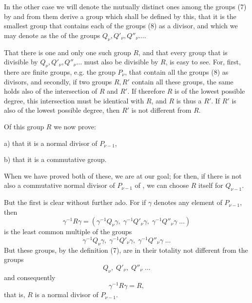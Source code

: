 In the other case we will denote the mutually distinct ones among the groups (7) by
and from them derive a group
which shall be defined by this, that it is the smallest group that contains each of the groups (8) as a divisor, and which we may denote as the  of the groups $Q_\nu, Q'_\nu, Q''_\nu \ldots$.

That there is one and only one such group $R$, and that every group that is divisible by $Q_\nu, Q'_\nu, Q''_\nu \ldots$ must also be divisible by $R$, is easy to see. For, first, there are finite groups, e.g. the group $P_\nu$, that contain all the groups (8) as divisors, and secondly, if two groups $R, R'$ contain all these groups, the same holds also of the intersection of $R$ and $R'$. If therefore $R$ is of the lowest possible degree, this intersection must be identical with $R$, and $R$ is thus a  $R'$. If $R'$ is also of the lowest possible degree, then $R'$ is not different from $R$.

Of this group $R$ we now prove:

a) that it is a normal divisor of $P_{\nu-1}$,

b) that it is a commutative group.

When we have proved both of these, we are at our goal; for then, if there is not also a commutative normal divisor of $P_{\nu-1}$ of , we can choose $R$ itself for $Q_{\nu-1}$.

But the first is clear without further ado. For if $\gamma$ denotes any element of $P_{\nu-1}$, then
\[ \gamma^{-1} R \gamma = (\gamma^{-1} Q_\nu \gamma, \; \gamma^{-1} Q'_\nu \gamma, \; \gamma^{-1} Q''_\nu \gamma \; \ldots) \]
is the least common multiple of the groups
\[ \gamma^{-1} Q_\nu \gamma, \; \gamma^{-1} Q'_\nu \gamma, \; \gamma^{-1} Q''_\nu \gamma \; \ldots \]
But these groups, by the definition (7), are in their totality not different from the groups
\[ Q_\nu, \; Q'_\nu, \; Q''_\nu \; \ldots \]
and consequently
\[ \gamma^{-1} R \gamma = R, \]
that is, $R$ is a normal divisor of $P_{\nu-1}$.
